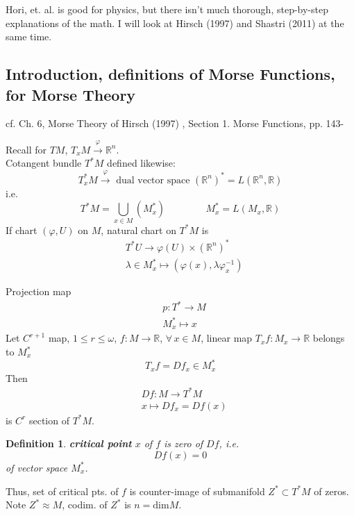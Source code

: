 \documentclass[10pt]{amsart}
\newtheorem{definition}{Definition}
\begin{document}
\begin{multicols*}{2}
\begin{itemize}
  \end{itemize}

Hori, et. al. \cite{Hori2003} is good for physics, but there isn't much thorough, step-by-step explanations of the math.  I will look at Hirsch (1997) \cite{MHirsch1997} and Shastri (2011) \cite{AShastri2011} at the same time.  

\subsection{Introduction, definitions of Morse Functions, for Morse Theory}

cf. Ch. 6, Morse Theory of Hirsch (1997) \cite{MHirsch1997}, Section 1. Morse Functions, pp. 143-

Recall for $TM$, $T_xM \xrightarrow{\varphi}\mathbb{R}^n$.  \\
Cotangent bundle $T^*M$ defined likewise:
\[
T^*_xM \xrightarrow{ \varphi } \text{ dual vector space } (\mathbb{R}^n)^* = L(\mathbb{R}^n,\mathbb{R})
\]
i.e.
\[
T^*M = \bigcup_{x\in M} (M_x^*) \qquad \qquad \, M_x^* = L(M_x,\mathbb{R})
\]
If chart $(\varphi, U)$ on $M$, natural chart on $T^*M$ is
\[
\begin{aligned}
  & T^*U \to \varphi(U) \times (\mathbb{R}^n)^* \\ 
  & \lambda \in M_x^* \mapsto (\varphi(x), \lambda \varphi_x^{-1} )
  \end{aligned}
\]

Projection map
\[
\begin{aligned}
  & p : T^* \to M \\ 
  & M_x^* \mapsto x
  \end{aligned}
\]
Let $C^{r+1}$ map, $1\leq r \leq \omega$, $f:M \to \mathbb{R}$, $\forall \, x \in M$, linear map $T_x f :M_x \to \mathbb{R}$ belongs to $M_x^*$
\[
T_xf = Df_x \in M_x^*
\]
Then
\[
\begin{aligned}
  & Df:M \to T^*M \\ 
  &  x\mapsto Df_x = Df(x)
  \end{aligned}
\]
is $C^r$ section of $T^*M$.  

\begin{definition}
  \textbf{critical point} $x$ of $f$ is zero of $Df$, i.e. \begin{equation}
Df(x) = 0 
  \end{equation} of vector space $M_x^*$.  
  \end{definition}

Thus, set of critical pts. of $f$ is counter-image of submanifold $Z^* \subset T^*M$ of zeros.  \\
Note $Z^*\approx M$, codim. of $Z^*$ is $n=\text{dim}M$.  


\end{multicols*}
\end{document}
